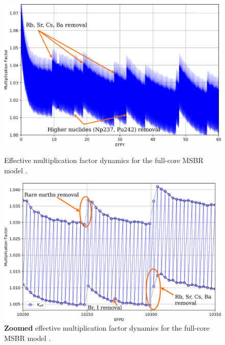 \begin{frame}
\begin{columns}
	\column{8cm}
	\begin{figure}[ht!] 
	\begin{overprint}
	\includegraphics[width=\textwidth]{../dissertation/figures/ch3/keff.png}
	\vspace{-2mm}
	\caption{Effective multiplication factor dynamics for the full-core 
	\gls{MSBR} model \cite{rykhlevskii_modeling_2019}.}
	\includegraphics[width=\textwidth]{../dissertation/figures/ch3/keff_zoomed.png}
	\vspace{-0.5mm}
	\caption{\textbf{Zoomed} effective multiplication factor dynamics for the 
	full-core \gls{MSBR} model \cite{rykhlevskii_modeling_2019}.}
	\end{overprint}
	\end{figure}
	
\end{columns}
\end{frame}

